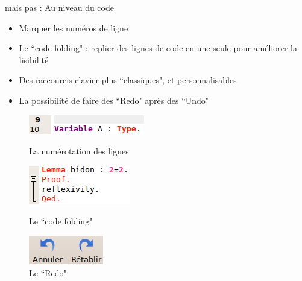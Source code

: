         \begin{frame}{\coquille{} mais pas \coqide{} : Au niveau du code}
            \begin{itemize}
                \item Marquer les numéros de ligne
                \item Le ``code folding" : replier des lignes de code en une seule pour améliorer la lisibilité
                \item Des raccourcis clavier plus ``classiques", et personnalisables
                \item La possibilité de faire des ``Redo" après des ``Undo"
            \end{itemize}
            \begin{figure}[ht]
                \begin{minipage}[b]{0.3\linewidth}
                    \centering
                    \includegraphics[scale=0.5]{../images/ide/lines.png}
                    \caption{La numérotation des lignes}
                \end{minipage}
                \hfill
                \begin{minipage}[b]{0.3\linewidth}   
	                \centering
	                \includegraphics[scale=0.5]{../images/ide/folding.png}
	                \caption{Le ``code folding"}
                \end{minipage}
                \hfill
                \begin{minipage}[b]{0.3\linewidth}   
	                \centering
	                \includegraphics[scale=0.5]{../images/ide/redo.png}
	                \caption{Le ``Redo"}
	            \end{minipage}
            \end{figure}
        \end{frame}
            
